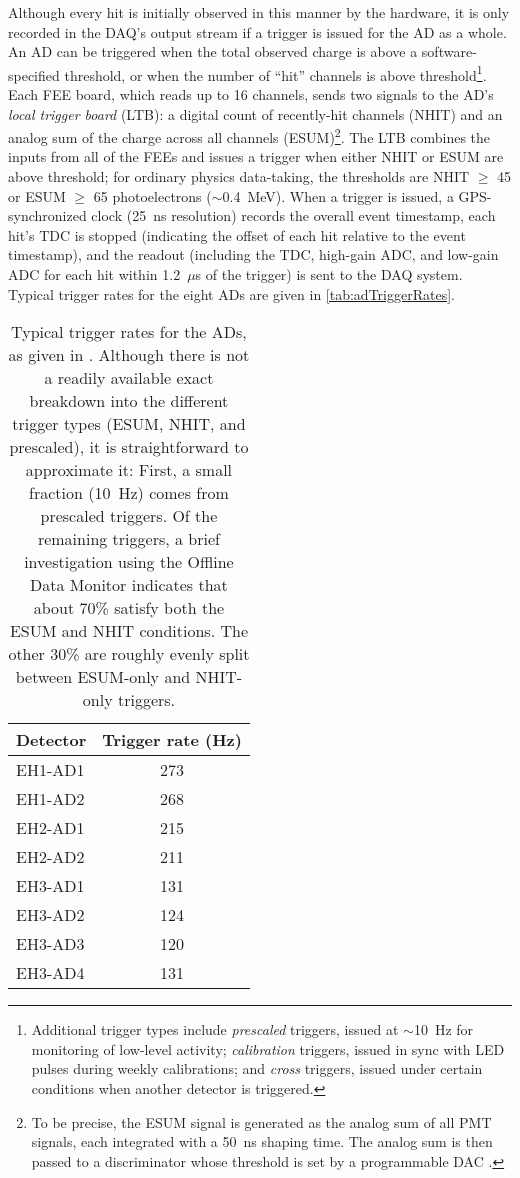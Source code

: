 \documentclass[../thesis.tex]{subfiles}
\begin{document}
Although every hit is initially observed in this manner by the hardware, it is only recorded in the DAQ's output stream if a trigger is issued for the AD as a whole. An AD can be triggered when the total observed charge is above a software-specified threshold, or when the number of ``hit'' channels is above threshold\footnote{Additional trigger types include \emph{prescaled} triggers, issued at $\sim$10~Hz for monitoring of low-level activity; \emph{calibration} triggers, issued in sync with LED pulses during weekly calibrations; and \emph{cross} triggers, issued under certain conditions when another detector is triggered.}. Each FEE board, which reads up to 16 channels, sends two signals to the AD's \emph{local trigger board} (LTB): a digital count of recently-hit channels (NHIT) and an analog sum of the charge across all channels (ESUM)\footnote{To be precise, the ESUM signal is generated as the analog sum of all PMT signals, each integrated with a 50~ns shaping time. The analog sum is then passed to a discriminator whose threshold is set by a programmable DAC \cite{TDR}.}. The LTB combines the inputs from all of the FEEs and issues a trigger when either NHIT or ESUM are above threshold; for ordinary physics data-taking, the thresholds are NHIT $\geq$ 45 or ESUM $\geq$ 65 photoelectrons ($\sim$0.4~MeV). When a trigger is issued, a GPS-synchronized clock (25~ns resolution) records the overall event timestamp, each hit's TDC is stopped (indicating the offset of each hit relative to the event timestamp), and the readout (including the TDC, high-gain ADC, and low-gain ADC for each hit within 1.2~$\mu$s of the trigger) is sent to the DAQ system. Typical trigger rates for the eight ADs are given in \autoref{tab:adTriggerRates}.

\begin{table}[h]
  \begin{tabular}{lc}
    \toprule
    Detector & Trigger rate (Hz) \\
    \midrule
    EH1-AD1 & 273 \\
    EH1-AD2 & 268 \\
    \midrule
    EH2-AD1 & 215 \\
    EH2-AD2 & 211 \\
    \midrule
    EH3-AD1 & 131 \\
    EH3-AD2 & 124 \\
    EH3-AD3 & 120 \\
    EH3-AD4 & 131 \\
    \bottomrule
  \end{tabular}
  \caption{Typical trigger rates for the ADs, as given in \cite{AN2016133}. Although there is not a readily available exact breakdown into the different trigger types (ESUM, NHIT, and prescaled), it is straightforward to approximate it: First, a small fraction (10~Hz) comes from prescaled triggers. Of the remaining triggers, a brief investigation using the Offline Data Monitor indicates that about 70\% satisfy both the ESUM and NHIT conditions. The other 30\% are roughly evenly split between ESUM-only and NHIT-only triggers.}
  \label{tab:adTriggerRates}
\end{table}
\end{document}
